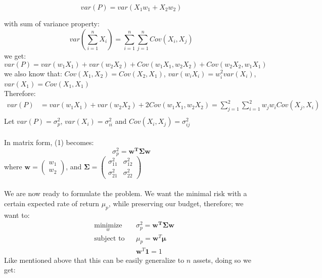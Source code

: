 \documentclass[12pt,titlepage,a4paper]{article}
\begin{document}
$$
var(P) = var(X_1w_1 + X_2w_2)
$$

with sum of variance property: $$var(\sum_{i=1}^{n}{X_i}) = \sum_{i=1}^n\sum_{j=1}^{n}{Cov(X_i,X_j)}$$
we get: 
$$
var(P) = var(w_1X_1)+var(w_2X_2)+Cov(w_1X_1,w_2X_2)+Cov(w_2X_2,w_1X_1)
$$
we also know that: $Cov(X_1,X_2) = Cov(X_2,X_1)$, $var(w_iX_i)=w_i^2var(X_i)$, $var(X_1)=Cov(X_1,X_1)$ \\
Therefore: 
\begin{equation}
\begin{split}
var(P) &= var(w_1X_1)+var(w_2X_2)+2Cov(w_1X_1,w_2X_2) = \sum_{j=1}^2{{\sum_{i=1}^2w_jw_iCov(X_j,X_i)}}\\
\end{split}
\end{equation}
Let $var(P)=\sigma_p^2$, $var(X_i)=\sigma_{ii}^2$ and $Cov(X_i,X_j)=\sigma_{ij}^2$ \\ \\
In matrix form, (1) becomes: 
\begin{equation*}
\sigma_p^2 = \mathbf{w^T\Sigma w}
\end{equation*}
where $\mathbf{w} = \begin{pmatrix} w_1 \\ w_2 \end{pmatrix}$, and $\mathbf{\Sigma} = \begin{pmatrix}\sigma_{11}^2 & \sigma_{12}^2 \\ \sigma_{21}^2 & \sigma_{22}^2 \end{pmatrix}$ \\ \\ 
We are now ready to formulate the problem. We want the minimal risk with a certain expected rate of return $\mu_p$, while preserving our budget, therefore; we want to: 
\begin{equation}
\begin{aligned}
& \underset{w}{\text{minimize}}
& &\sigma_p^2 = \mathbf{w^T\Sigma w}\\
& \text{subject to}
& & \mu_p = \mathbf{w}^T\pmb{\mu} \\
&&& \mathbf{w}^T\mathbf{1}=1
\end{aligned}
\end{equation}
Like mentioned above that this can be easily generalize to $n$ assets, doing so we get: 
\end{document}
